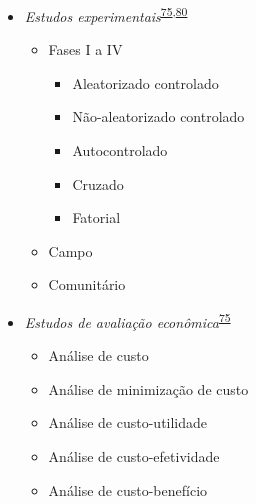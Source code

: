 \documentclass[
]{book}
\providecommand{\tightlist}{%
  \setlength{\itemsep}{0pt}\setlength{\parskip}{0pt}}
\begin{document}
\begin{itemize}
\tightlist
\item
  \emph{Estudos experimentais}\textsuperscript{\protect\hyperlink{ref-Suxfct2014}{75},\protect\hyperlink{ref-Chidambaram2019}{80}}

  \begin{itemize}
  \tightlist
  \item
    Fases I a IV

    \begin{itemize}
    \tightlist
    \item
      Aleatorizado controlado
    \item
      Não-aleatorizado controlado
    \item
      Autocontrolado
    \item
      Cruzado
    \item
      Fatorial
    \end{itemize}
  \item
    Campo
  \item
    Comunitário
  \end{itemize}
\end{itemize}

\begin{itemize}
\tightlist
\item
  \emph{Estudos de avaliação econômica}\textsuperscript{\protect\hyperlink{ref-Suxfct2014}{75}}

  \begin{itemize}
  \tightlist
  \item
    Análise de custo
  \item
    Análise de minimização de custo
  \item
    Análise de custo-utilidade
  \item
    Análise de custo-efetividade
  \item
    Análise de custo-benefício
  \end{itemize}
\end{itemize}
\end{document}

